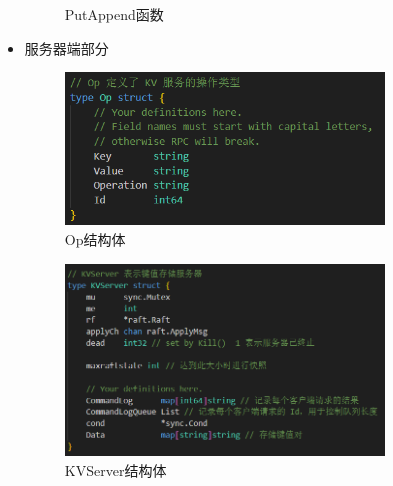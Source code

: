 \documentclass[]{article}
\begin{document}
\begin{itemize}
\begin{figure}[H]
			\caption{PutAppend函数}
		\end{figure}
		\item 服务器端部分
		\begin{figure}[H]
			\centering
			\includegraphics[width=0.8\textwidth]{./3A/Op.png}
			\caption{Op结构体}
		\end{figure}
		\begin{figure}[H]
			\centering
			\includegraphics[width=0.8\textwidth]{./3A/KVServer.png}
			\caption{KVServer结构体}
		\end{figure}
		\begin{figure}[H]
			\centering

\end{figure}
\end{itemize}
\end{document}
